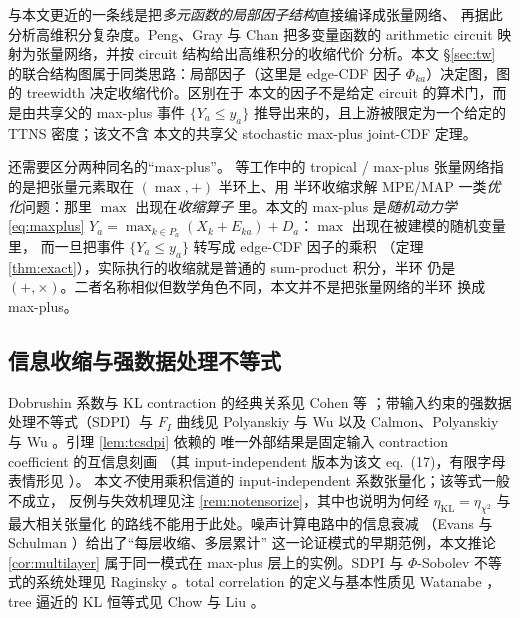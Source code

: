 \documentclass[a4paper,11pt]{article}
\theoremstyle{definition}
\newcommand{\1}{\mathbf 1}
\newcommand{\KL}{\mathrm{KL}}
\begin{document}
与本文更近的一条线是把\emph{多元函数的局部因子结构}直接编译成张量网络、
再据此分析高维积分复杂度。Peng、Gray 与 Chan \cite{Peng2023} 把多变量函数的
arithmetic circuit 映射为张量网络，并按 circuit 结构给出高维积分的收缩代价
分析。本文 \S\ref{sec:tw} 的联合结构图属于同类思路：局部因子（这里是
edge-CDF 因子 $\Phi_{ka}$）决定图，图的 treewidth 决定收缩代价。区别在于
本文的因子不是给定 circuit 的算术门，而是由共享父的 max-plus 事件
$\{Y_a\le y_a\}$ 推导出来的，且上游被限定为一个给定的 TTNS 密度；该文不含
本文的共享父 stochastic max-plus joint-CDF 定理。

还需要区分两种同名的“max-plus”。\cite{RoaVillescas2024} 等工作中的
tropical / max-plus 张量网络指的是把张量元素取在 $(\max,+)$ 半环上、用
半环收缩求解 MPE/MAP 一类\emph{优化}问题：那里 $\max$ 出现在\emph{收缩算子}
里。本文的 max-plus 是\emph{随机动力学} \eqref{eq:maxplus}
$Y_a=\max_{k\in P_a}(X_k+E_{ka})+D_a$：$\max$ 出现在被建模的随机变量里，
而一旦把事件 $\{Y_a\le y_a\}$ 转写成 edge-CDF 因子的乘积
（定理 \ref{thm:exact}），实际执行的收缩就是普通的 sum-product 积分，半环
仍是 $(+,\times)$。二者名称相似但数学角色不同，本文并不是把张量网络的半环
换成 max-plus。

\subsection{信息收缩与强数据处理不等式}

Dobrushin 系数与 KL contraction 的经典关系见 Cohen 等
\cite{Cohen1993}；带输入约束的强数据处理不等式（SDPI）与
$F_I$ 曲线见 Polyanskiy 与 Wu \cite{PolyanskiyWu2016,PolyanskiyWu2017} 以及
Calmon、Polyanskiy 与 Wu \cite{Calmon2018}。引理 \ref{lem:tcsdpi} 依赖的
唯一外部结果是固定输入 contraction coefficient 的互信息刻画
\cite[Theorem 4]{PolyanskiyWu2017}（其 input-independent 版本为该文
eq.~(17)，有限字母表情形见 \cite[Exercise III.3.12]{CsiszarKorner1981}）。
本文\emph{不}使用乘积信道的 input-independent 系数张量化；该等式一般不成立，
反例与失效机理见注 \ref{rem:notensorize}，其中也说明为何经
$\eta_{\KL}=\eta_{\chi^2}$ \cite[Theorem 3]{PolyanskiyWu2017} 与最大相关张量化
\cite[Theorem 1]{Witsenhausen1975} 的路线不能用于此处。噪声计算电路中的信息衰减
（Evans 与 Schulman \cite{EvansSchulman1999}）给出了“每层收缩、多层累计”
这一论证模式的早期范例，本文推论 \ref{cor:multilayer} 属于同一模式在
max-plus 层上的实例。SDPI 与 $\Phi$-Sobolev 不等式的系统处理见 Raginsky
\cite{Raginsky2016}。total correlation 的定义与基本性质见 Watanabe
\cite{Watanabe1960}，tree 逼近的 KL 恒等式见 Chow 与 Liu
\cite{ChowLiu1968}。
\end{document}
